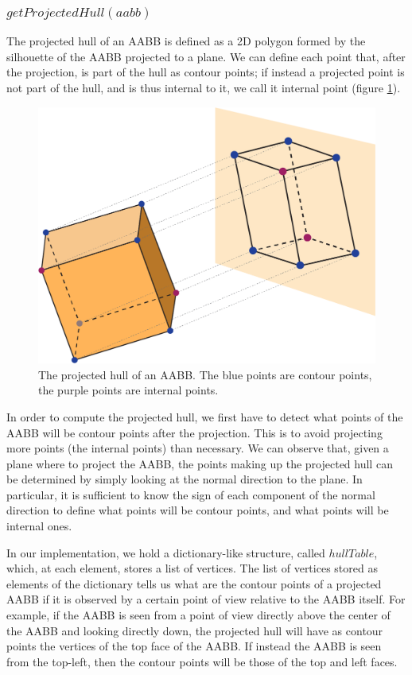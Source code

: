 \documentclass{PoliMi_MasterThesis}
\begin{document}
\subsubsection*{$getProjectedHull(aabb)$} \label{ssec:parallel_getProjectedHull}
The projected hull of an AABB is defined as a 2D polygon formed by the silhouette of the AABB projected to a plane. We can define each point that, after the projection, is part of the hull as contour points; if instead a projected point is not part of the hull, and is thus internal to it, we call it internal point (figure \ref{fig:aabb_ortho_hull}). 

\begin{figure}[H]
	\centering
	\includegraphics[width=\textwidth*\real{0.45}]{Images/contour_internal_points.png}
	\caption{The projected hull of an AABB. The blue points are contour points, the purple points are internal points.}
	\label{fig:aabb_ortho_hull}
\end{figure}

In order to compute the projected hull, we first have to detect what points of the AABB will be contour points after the projection. This is to avoid projecting more points (the internal points) than necessary. We can observe that, given a plane where to project the AABB, the points making up the projected hull can be determined by simply looking at the normal direction to the plane. In particular, it is sufficient to know the sign of each component of the normal direction to define what points will be contour points, and what points will be internal ones.

In our implementation, we hold a dictionary-like structure, called $hullTable$, which, at each element, stores a list of vertices. The list of vertices stored as elements of the dictionary tells us what are the contour points of a projected AABB if it is observed by a certain point of view relative to the AABB itself. For example, if the AABB is seen from a point of view directly above the center of the AABB and looking directly down, the projected hull will have as contour points the vertices of the top face of the AABB. If instead the AABB is seen from the top-left, then the contour points will be those of the top and left faces.
\end{document}
